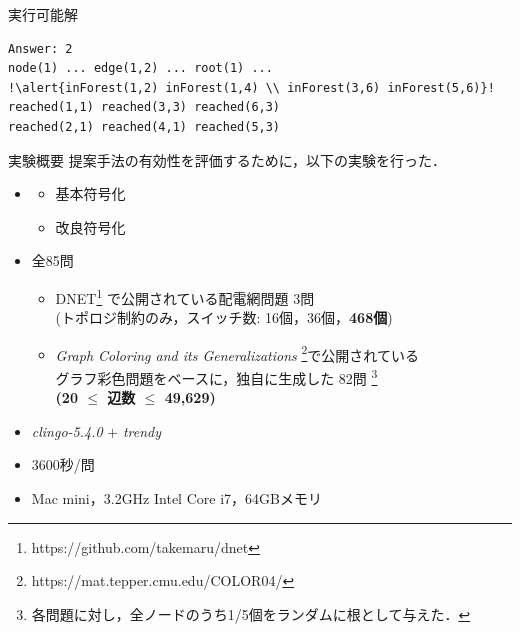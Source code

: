 \documentclass[dvipdfmx,11pt]{beamer}
\begin{document}
\begin{frame}[fragile]{実行可能解}
\begin{lstlisting}[escapechar=!]
Answer: 2
node(1) ... edge(1,2) ... root(1) ... 
!\alert{inForest(1,2) inForest(1,4) \\ inForest(3,6) inForest(5,6)}!
reached(1,1) reached(3,3) reached(6,3) 
reached(2,1) reached(4,1) reached(5,3)
\end{lstlisting}\vfill
\begin{figure}
 \centering \large
 
\end{figure}
\end{frame}
\begin{frame}{実験概要}
  \renewcommand{\thefootnote}{\fnsymbol{footnote}}
  \setcounter{footnote}{1}
  提案手法の有効性を評価するために，以下の実験を行った．
  \begin{itemize}
  \item {}
    \begin{itemize}
    \item 基本符号化
    \item 改良符号化
    \end{itemize}
  \item {} 全85問
    \begin{itemize}
    \item DNET\footnote{https://github.com/takemaru/dnet}%
      で公開されている配電網問題 3問 \\ (トポロジ制約のみ，スイッチ数:
      16個，36個，\alert{\bf 468個})
    \item \textit{Graph Coloring and its Generalizations}
      \footnote{https://mat.tepper.cmu.edu/COLOR04/}で公開されている \\
      グラフ彩色問題をベースに，独自に生成した 82問 
      \footnote{各問題に対し，全ノードのうち1/5個をランダムに根として与えた．}\\
      \alert{\bf (20 $\leq$ 辺数 $\leq$ 49,629)}
    \end{itemize}
  \item {} \textit{clingo-5.4.0} $+$ \textit{trendy}
  \item {} 3600秒/問
  \item {} Mac mini，3.2GHz Intel Core i7，64GBメモリ
  \end{itemize}
\end{frame}
\end{document}
